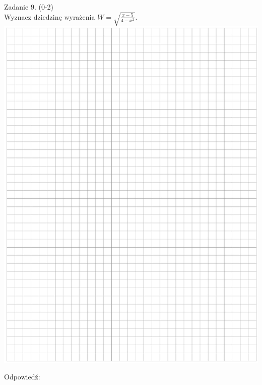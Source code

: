 \documentclass[10pt]{article}
\begin{document}
Zadanie 9. (0-2)\\
Wyznacz dziedzinę wyrażenia \(W=\sqrt{\frac{x-5}{4-x^{2}}}\).\\
\includegraphics[max width=\textwidth, center]{2024_11_21_c0ca116654784d42326bg-06}

Odpowiedź:
\end{document}
